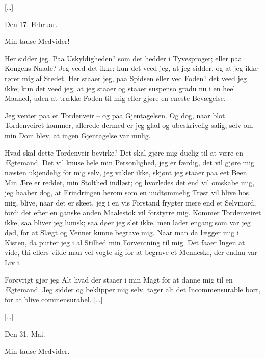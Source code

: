 \documentclass[12pt,a4paper]{article}
\begin{document}
[…]

Den 17. Februar.

Min tause Medvider!

Her sidder jeg. Paa Uskyldigheden? som det hedder i Tyvesproget; eller paa Kongens Naade? Jeg veed det ikke; kun det veed jeg, at jeg sidder, og at jeg ikke rører mig af Stedet. Her staaer jeg, paa Spidsen eller ved Foden? det veed jeg ikke; kun det veed jeg, at jeg staaer og staaer suspenso gradu nu i en heel Maaned, uden at trække Foden til mig eller gjøre en eneste Bevægelse.

Jeg venter paa et Tordenveir – og paa Gjentagelsen. Og dog, naar blot Tordenveiret kommer, allerede dermed er jeg glad og ubeskrivelig salig, selv om min Dom blev, at ingen Gjentagelse var mulig.

Hvad skal dette Tordenveir bevirke? Det skal gjøre mig duelig til at være en Ægtemand. Det vil knuse hele min Personlighed, jeg er færdig, det vil gjøre mig næsten ukjendelig for mig selv, jeg vakler ikke, skjønt jeg staaer paa eet Been. Min Ære er reddet, min Stolthed indløst; og hvorledes det end vil omskabe mig, jeg haaber dog, at Erindringen herom som en uudtømmelig Trøst vil blive hos mig, blive, naar det er skeet, jeg i en vis Forstand frygter mere end et Selvmord, fordi det efter en ganske anden Maalestok vil forstyrre mig. Kommer Tordenveiret ikke, saa bliver jeg lumsk; saa døer jeg slet ikke, men lader engang som var jeg død, for at Slægt og Venner kunne begrave mig. Naar man da lægger mig i Kisten, da putter jeg i al Stilhed min Forventning til mig. Det faaer Ingen at vide, thi ellers vilde man vel vogte sig for at begrave et Menneske, der endnu var Liv i.

Forøvrigt gjør jeg Alt hvad der staaer i min Magt for at danne mig til en Ægtemand. Jeg sidder og beklipper mig selv, tager alt det Incommensurable bort, for at blive commensurabel. […]

[…]

Den 31. Mai.

Min tause Medvider.
\end{document}
